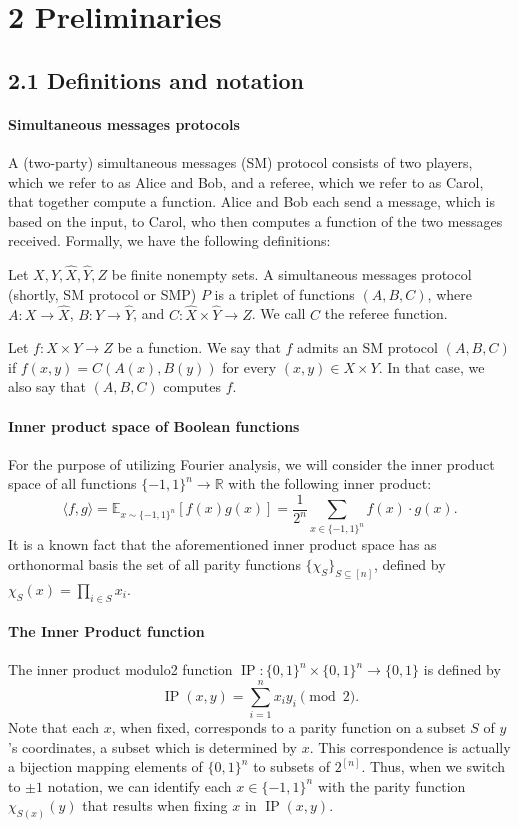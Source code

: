 \section*{2 Preliminaries}
\subsection*{2.1 Definitions and notation}
\paragraph{Simultaneous messages protocols}
A (two-party) simultaneous messages (SM) protocol consists of two players, which we refer to as Alice and Bob, and a referee, which we refer to as Carol, that together compute a function. Alice and Bob each send a message, which is based on the input, to Carol, who then computes a function of the two messages received. Formally, we have the following definitions:
\setcounter{nttheorem}{2}
\begin{ntdefinition}
Let $X,Y,\widehat X,\widehat Y,Z$ be finite nonempty sets. A simultaneous messages protocol (shortly, SM protocol or SMP) $P$ is a triplet of functions $(A,B,C)$, where $A:X\to\widehat X$, $B:Y\to\widehat Y$, and $C:\widehat X\times\widehat Y\to Z$. We call $C$ the referee function.
\end{ntdefinition}
\begin{ntdefinition}
Let $f:X\times Y\to Z$ be a function. We say that $f$ admits an SM protocol $(A,B,C)$ if $f(x,y)=C(A(x),B(y))$ for every $(x,y)\in X\times Y$. In that case, we also say that $(A,B,C)$ computes $f$.
\end{ntdefinition}
\paragraph{Inner product space of Boolean functions}
For the purpose of utilizing Fourier analysis, we will consider the inner product space of all functions $\{-1,1\}^n\to\mathbb R$ with the following inner product:
\[\langle f,g\rangle=\mathbb E_{x\sim\{-1,1\}^n}[f(x)g(x)]=\frac1{2^n}\sum_{x\in\{-1,1\}^n}f(x)\cdot g(x).\]
It is a known fact that the aforementioned inner product space has as orthonormal basis the set of all parity functions $\{\chi_S\}_{S\subseteq[n]}$, defined by $\chi_S(x)=\prod_{i\in S}x_i$.
\paragraph{The Inner Product function}
The inner product modulo2 function $\operatorname{IP}:\{0,1\}^n\times\{0,1\}^n\to\{0,1\}$ is defined by
\[\operatorname{IP}(x,y)=\sum_{i=1}^nx_iy_i\pmod2.\]
Note that each $x$, when fixed, corresponds to a parity function on a subset $S$ of $y$'s coordinates, a subset which is determined by $x$. This correspondence is actually a bijection mapping elements of $\{0,1\}^n$ to subsets of $2^{[n]}$. Thus, when we switch to $\pm1$ notation, we can identify each $x\in\{-1,1\}^n$ with the parity function $\chi_{S(x)}(y)$ that results when fixing $x$ in $\operatorname{IP}(x,y)$.
